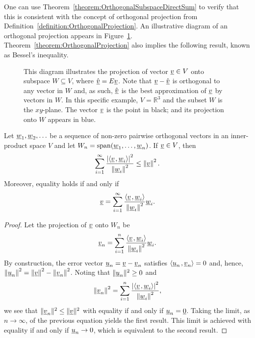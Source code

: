 One can use Theorem~\ref{theorem:OrthogonalSubspaceDirectSum} to verify that this is consistent with the concept of orthogonal projection from Definition~\ref{definition:OrthogonalProjection}.
An illustrative diagram of an orthogonal projection appears in Figure~\ref{fig:AR-Projection1}.
Theorem~\ref{theorem:OrthogonalProjection} also implies the following result, known as Bessel's inequality.

\begin{figure}[hbt]
\centering{}
\caption{This diagram illustrates the projection of vector $\underline{v} \in V$ onto subspace $W \subseteq V$, where $\hat{\underline{v}} = E \underline{v}$.
Note that $\underline{v} - \hat{\underline{v}}$ is orthogonal to any vector in $W$ and, as such, $\hat{\underline{v}}$ is the best approximation of $\underline{v}$ by vectors in $W$.
In this specific example, $V=\mathbb{R}^3$ and the subset $W$ is the $xy$-plane.
The vector $\underline{v}$ is the point in black; and its projection onto $W$ appears in blue.}
\label{fig:AR-Projection1}
\end{figure}

\begin{corollary}
Let $\underline{w}_1, \underline{w}_2, \ldots$ be a sequence of non-zero pairwise orthogonal vectors in an inner-product space $V$ and let $W_n = \mathrm{span}(\underline{w}_1, \ldots, \underline{w}_n)$.
If $\underline{v} \in V$, then
\begin{equation*}
\sum_{i=1}^\infty \frac{ \left| {\left\langle  \underline{v}  \mskip2mu ,  \underline{w}_i  \right\rangle} \right|^2 }{ \left\| \underline{w}_i \right\|^2 }
\leq \left\| \underline{v} \right\|^2.
\end{equation*}
Moreover, equality holds if and only if
\begin{equation*}
\underline{v} = \sum_{i=1}^\infty \frac{ {\left\langle  \underline{v}  \mskip2mu ,  \underline{w}_i  \right\rangle} }{ \left\| \underline{w}_i \right\|^2 } \underline{w}_i .
\end{equation*}
\end{corollary}
\begin{proof}
Let the projection of $\underline{v}$ onto $W_n$ be
\begin{equation*}
\underline{v}_n = \sum_{i=1}^n \frac{ {\left\langle  \underline{v}  \mskip2mu ,  \underline{w}_i  \right\rangle} }{ \left\| \underline{w}_i \right\|^2 } \underline{w}_i  .
\end{equation*}
By construction, the error vector $\underline{u}_n = \underline{v} - \underline{v}_n$ satisfies  ${\left\langle  \underline{u}_n  \mskip2mu ,  \underline{v}_n  \right\rangle} = 0$ and, hence, $\left\| \underline{u}_n \right\|^2 = \left\| \underline{v} \right\|^2 - \left\| \underline{v}_n \right\|^2$.
Noting that $\| \underline{u}_n \|^2 \geq 0$ and 
\begin{equation*}
\left\| \underline{v}_n \right\|^2
= \sum_{i=1}^n \frac{ \left| {\left\langle  \underline{v}  \mskip2mu ,  \underline{w}_i  \right\rangle} \right|^2 }{ \left\| \underline{w}_i \right\|^2 },
\end{equation*}
we see that $\| \underline{v}_n \|^2 \leq \| \underline{v} \|^2$ with equality if and only if $\underline{u}_n = \underline{0}$.
Taking the limit, as $n \to \infty$, of the previous equation yields the first result.
This limit is achieved with equality if and only if $\underline{u}_n \to 0$, which is equivalent to the second result.
\end{proof}

